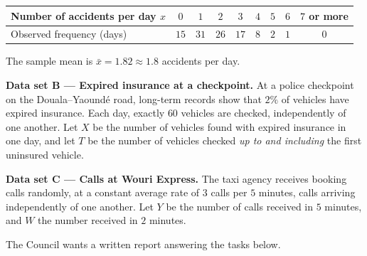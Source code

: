 \documentclass[11pt]{article}
\newcounter{popsec}
\newcounter{popsub}
\newcommand{\courssub}[1]{%
  \stepcounter{popsub}%
  \par\vspace{9pt}\noindent{\popxbold\fontsize{11.5}{13}\selectfont\color{popink}{\color{poporange}\thepopsec.\thepopsub}\hspace{6pt}#1}\par\nopagebreak\vspace{4pt}
}
\begin{document}
\begin{center}
\begin{tabular}{|l|cccccccc|}
\hline
\rowcolor{popblueL} Number of accidents per day $x$ & $0$ & $1$ & $2$ & $3$ & $4$ & $5$ & $6$ & $7$ or more \\
\hline Observed frequency (days) & $15$ & $31$ & $26$ & $17$ & $8$ & $2$ & $1$ & $0$ \\
\hline
\end{tabular}
\end{center}

The sample mean is $\bar{x} = 1.82 \approx 1.8$ accidents per day.

\textbf{Data set B — Expired insurance at a checkpoint.} At a police checkpoint on the Douala--Yaoundé road, long-term records show that $2\%$ of vehicles have expired insurance. Each day, exactly $60$ vehicles are checked, independently of one another. Let $X$ be the number of vehicles found with expired insurance in one day, and let $T$ be the number of vehicles checked \emph{up to and including} the first uninsured vehicle.

\textbf{Data set C — Calls at Wouri Express.} The taxi agency receives booking calls randomly, at a constant average rate of $3$ calls per $5$ minutes, calls arriving independently of one another. Let $Y$ be the number of calls received in $5$ minutes, and $W$ the number received in $2$ minutes.

The Council wants a written report answering the tasks below.

\courssub{Tasks}
\end{document}
